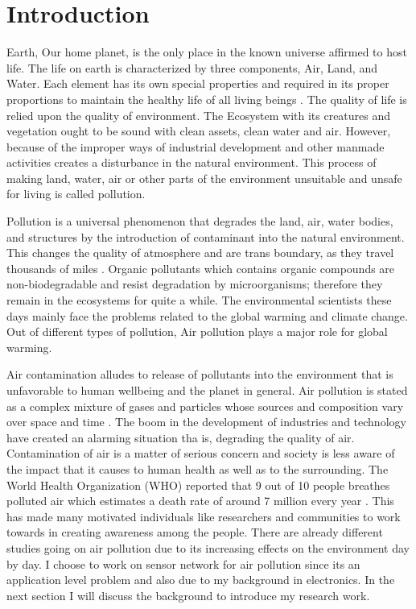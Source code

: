 \chapter{Introduction}
\setcounter{page}{1}




Earth, Our home planet, is the only place in the known universe affirmed to host life. The life on earth is characterized by three components, Air, Land, and Water. Each element has its own special properties and required in its proper proportions to maintain the healthy life of all living beings \cite{environment}. The quality of life is relied upon the quality of environment. The Ecosystem with its creatures and vegetation ought to be sound with clean assets, clean water and air.  However, because of the improper ways of industrial development and  other manmade activities creates a disturbance in the natural environment. This process of making land, water, air or other parts of the environment unsuitable and unsafe for living is called pollution. 
\par
Pollution is a universal phenomenon that degrades the land, air, water bodies, and structures by the introduction of contaminant into the natural environment. This changes the quality of atmosphere and are trans boundary, as they travel thousands of miles  \cite{environment}. Organic pollutants which contains organic compounds are non-biodegradable and resist degradation by microorganisms; therefore they remain in the ecosystems for quite a while. 
The environmental scientists these days mainly face the problems related to the global warming and climate change. Out of different types of pollution, Air pollution plays a major role for global warming.
\par
 Air contamination alludes to release of pollutants into the environment that is unfavorable to human wellbeing and the planet in general. Air pollution is stated as a complex mixture of gases and particles whose sources and composition vary over space and time \cite{HealthEffectsInstitute2017}. The boom in the development of industries and technology have created an alarming situation tha is, degrading the quality of air. Contamination of air is a matter of serious concern and society is less aware of the impact that it causes to human health as well as to the surrounding. The World Health Organization (WHO) reported that 9 out of 10 people breathes polluted air which estimates a death rate of around 7 million every year \cite{who} \cite{WHO2010}. This has made many motivated individuals like researchers and communities to work towards in creating awareness among the people. There are already different studies going on air pollution due to its increasing effects on the environment day by day. I choose to work on sensor network for air pollution since its an application level problem and also due to my background in electronics. In the next section I will discuss the background to introduce my research work.


